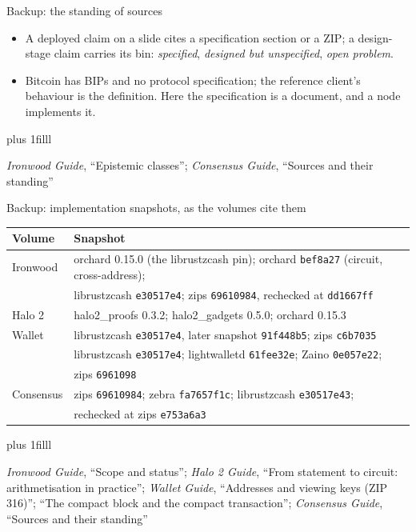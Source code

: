 \documentclass[aspectratio=169,11pt]{beamer}
\newcommand{\src}[1]{\par\vskip0pt plus 1filll
  {\fontsize{6}{7.2}\selectfont\color{arbdim}\raggedright #1\par}}
\begin{document}
\begin{frame}{Backup: the standing of sources}
\begin{itemize}
  \item A deployed claim on a slide cites a specification section or a
    ZIP; a design-stage claim carries its bin: \emph{specified},
    \emph{designed but unspecified}, \emph{open problem}.
  \item Bitcoin has BIPs and no protocol specification; the reference
    client's behaviour is the definition. Here the specification is a
    document, and a node implements it.
\end{itemize}
\src{\emph{Ironwood Guide}, ``Epistemic classes''; \emph{Consensus Guide},
  ``Sources and their standing''}
\end{frame}

\begin{frame}{Backup: implementation snapshots, as the volumes cite them}
\begin{center}\small
\begin{tabular}{@{}ll@{}}
\toprule
Volume & Snapshot \\
\midrule
Ironwood & \textsf{orchard} 0.15.0 (the \textsf{librustzcash} pin);
  \textsf{orchard} \texttt{bef8a27} (circuit, cross-address); \\
  & \textsf{librustzcash} \texttt{e30517e4}; \textsf{zips}
  \texttt{69610984}, rechecked at \texttt{dd1667ff} \\
Halo 2 & \textsf{halo2\_proofs} 0.3.2; \textsf{halo2\_gadgets} 0.5.0;
  \textsf{orchard} 0.15.3 \\
Wallet & \textsf{librustzcash} \texttt{e30517e4}, later snapshot
  \texttt{91f448b5}; \textsf{zips} \texttt{c6b7035} \\
  & \textsf{librustzcash} \texttt{e30517e4}; \textsf{lightwalletd}
  \texttt{61fee32e}; \textsf{Zaino} \texttt{0e057e22}; \\
  & \textsf{zips} \texttt{6961098} \\
Consensus & \textsf{zips} \texttt{69610984}; \textsf{zebra}
  \texttt{fa7657f1c}; \textsf{librustzcash} \texttt{e30517e43}; \\
  & rechecked at \textsf{zips} \texttt{e753a6a3} \\
\bottomrule
\end{tabular}
\end{center}
\src{\emph{Ironwood Guide}, ``Scope and status''; \emph{Halo 2 Guide}, ``From
statement to circuit: arithmetisation in practice''; \emph{Wallet Guide},
``Addresses and viewing keys (ZIP 316)''; ``The compact block and the compact
transaction''; \emph{Consensus Guide}, ``Sources and their standing''}
\end{frame}
\end{document}

